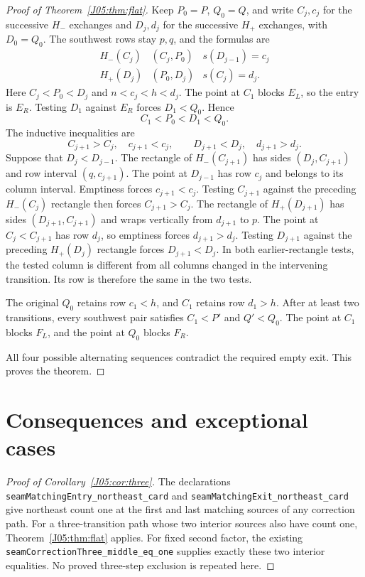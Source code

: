 \documentclass[11pt,oneside]{report}
\theoremstyle{definition}
\numberwithin{equation}{section}
\newcommand{\decl}[1]{\textnormal{\nolinkurl{#1}}}
\newcommand{\Hp}{H_+}\newcommand{\Hm}{H_-}
\begin{document}
\begin{proof}[Proof of Theorem~\ref{J05:thm:flat}]
Keep $P_0=P$, $Q_0=Q$, and write $C_j,c_j$ for the successive $\Hm$
exchanges and $D_j,d_j$ for the successive $\Hp$ exchanges, with
$D_0=Q_0$. The southwest rows stay $p,q$, and the formulas are
\[
 \begin{array}{c|c|c}
 \Hm(C_j)&(C_j,P_0)&s(D_{j-1})=c_j\\
 \Hp(D_j)&(P_0,D_j)&s(C_j)=d_j.
 \end{array}
\]
Here $C_j<P_0<D_j$ and $n<c_j<h<d_j$.
The point at $C_1$ blocks $E_L$, so the entry is $E_R$.
Testing $D_1$ against $E_R$ forces $D_1<Q_0$. Hence
\[
 C_1<P_0<D_1<Q_0.
\]
The inductive inequalities are
\[
 C_{j+1}>C_j,\quad c_{j+1}<c_j,\qquad
 D_{j+1}<D_j,\quad d_{j+1}>d_j.
\]
Suppose that $D_j<D_{j-1}$. The rectangle of $\Hm(C_{j+1})$ has sides
$(D_j,C_{j+1})$ and row interval $(q,c_{j+1})$. The point at
$D_{j-1}$ has row $c_j$ and belongs to its column interval.
Emptiness forces $c_{j+1}<c_j$. Testing $C_{j+1}$ against the preceding
$\Hm(C_j)$ rectangle then forces $C_{j+1}>C_j$.
The rectangle of $\Hp(D_{j+1})$ has sides $(D_{j+1},C_{j+1})$ and wraps
vertically from $d_{j+1}$ to $p$. The point at $C_j<C_{j+1}$ has row $d_j$,
so emptiness forces $d_{j+1}>d_j$. Testing $D_{j+1}$ against the preceding
$\Hp(D_j)$ rectangle forces $D_{j+1}<D_j$. In both earlier-rectangle tests,
the tested column is different from all columns changed in the intervening
transition. Its row is therefore the same in the two tests.

The original $Q_0$ retains row $c_1<h$, and $C_1$ retains row $d_1>h$.
After at least two transitions, every southwest pair satisfies
$C_1<P'$ and $Q'<Q_0$. The point at $C_1$ blocks $F_L$, and the point at
$Q_0$ blocks $F_R$.

All four possible alternating sequences contradict the required empty exit.
This proves the theorem.
\end{proof}

\section{Consequences and exceptional cases}

\begin{proof}[Proof of Corollary~\ref{J05:cor:three}]
The declarations \decl{seamMatchingEntry_northeast_card} and
\decl{seamMatchingExit_northeast_card} give northeast count one at the first
and last matching sources of any correction path. For a three-transition
path whose two interior sources also have count one, Theorem~\ref{J05:thm:flat}
applies. For fixed second factor, the existing
\decl{seamCorrectionThree_middle_eq_one} supplies exactly these two interior
equalities. No proved three-step exclusion is repeated here.
\end{proof}
\end{document}
